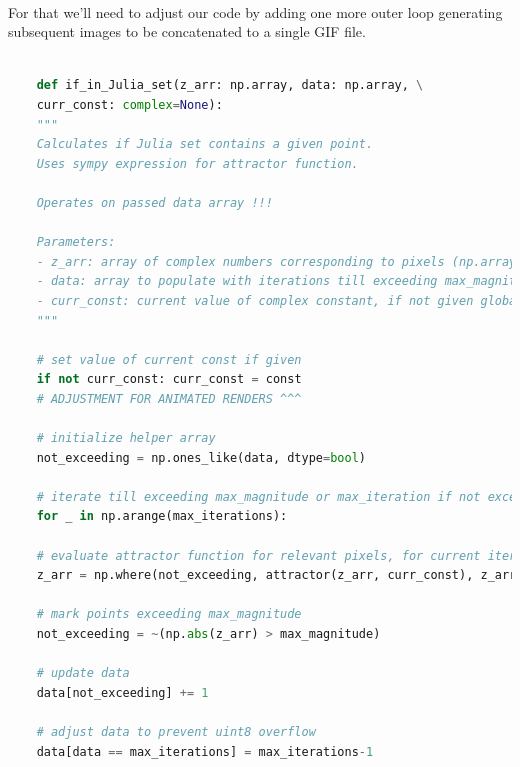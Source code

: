 \documentclass{article}
\begin{document}
\\[1\baselineskip]
For that we'll need to adjust our code by adding one more outer loop generating subsequent images to be concatenated to a single GIF file.
\pagebreak


\begin{lstlisting}[language=Python, caption=if\_in\_Julia\_set adjustments for GIF format]
	
	def if_in_Julia_set(z_arr: np.array, data: np.array, \
	curr_const: complex=None):
	"""
	Calculates if Julia set contains a given point.
	Uses sympy expression for attractor function.
	
	Operates on passed data array !!!
	
	Parameters:
	- z_arr: array of complex numbers corresponding to pixels (np.array)
	- data: array to populate with iterations till exceeding max_magnitude or max_iteration if not exceeded (np.array)
	- curr_const: current value of complex constant, if not given global const value will be utilized (complex)
	"""
	
	# set value of current const if given
	if not curr_const: curr_const = const
	# ADJUSTMENT FOR ANIMATED RENDERS ^^^
	
	# initialize helper array
	not_exceeding = np.ones_like(data, dtype=bool)
	
	# iterate till exceeding max_magnitude or max_iteration if not exceeded
	for _ in np.arange(max_iterations):
	
	# evaluate attractor function for relevant pixels, for current iteration
	z_arr = np.where(not_exceeding, attractor(z_arr, curr_const), z_arr)
	
	# mark points exceeding max_magnitude
	not_exceeding = ~(np.abs(z_arr) > max_magnitude)
	
	# update data
	data[not_exceeding] += 1
	
	# adjust data to prevent uint8 overflow
	data[data == max_iterations] = max_iterations-1
	
\end{lstlisting}
\end{document}
